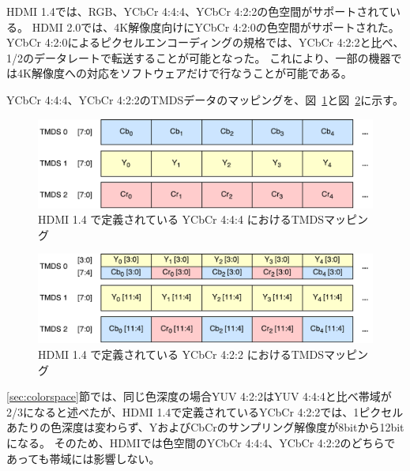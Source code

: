 HDMI 1.4\cite{hdmi-spec-1-4}では、RGB、YCbCr 4:4:4、YCbCr 4:2:2の色空間がサポートされている。
HDMI 2.0\cite{hdmi-spec-2-0}では、4K解像度向けにYCbCr 4:2:0の色空間がサポートされた。
YCbCr 4:2:0によるピクセルエンコーディングの規格では、YCbCr 4:2:2と比べ、1/2のデータレートで転送することが可能となった。
これにより、一部の機器では4K解像度への対応をソフトウェアだけで行なうことが可能である。

YCbCr 4:4:4、YCbCr 4:2:2のTMDSデータのマッピングを、図~\ref{fig:hdmi-spec-yuv-444}と図~\ref{fig:hdmi-spec-yuv-422}に示す。

\begin{figure}[htbp]
  \begin{center}
    \includegraphics[bb=0 0 531 141,width=13.926cm]{img/hdmi-spec-yuv-444.pdf}
  \end{center}
  \caption{HDMI 1.4 で定義されている YCbCr 4:4:4 におけるTMDSマッピング}
  \label{fig:hdmi-spec-yuv-444}
\end{figure}

\begin{figure}[htbp]
  \begin{center}
    \includegraphics[bb=0 0 531 141,width=13.926cm]{img/hdmi-spec-yuv-422.pdf}
  \end{center}
  \caption{HDMI 1.4 で定義されている YCbCr 4:2:2 におけるTMDSマッピング}
  \label{fig:hdmi-spec-yuv-422}
\end{figure}

\ref{sec:colorspace}節では、同じ色深度の場合YUV 4:2:2はYUV 4:4:4と比べ帯域が2/3になると述べたが、HDMI 1.4で定義されているYCbCr 4:2:2では、1ピクセルあたりの色深度は変わらず、YおよびCbCrのサンプリング解像度が8bitから12bitになる。
そのため、HDMIでは色空間のYCbCr 4:4:4、YCbCr 4:2:2のどちらであっても帯域には影響しない。

